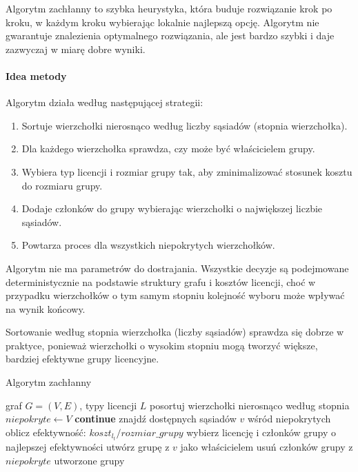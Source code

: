 Algorytm zachłanny to szybka heurystyka, która buduje rozwiązanie krok po kroku, w każdym kroku wybierając lokalnie najlepszą opcję. Algorytm nie gwarantuje znalezienia optymalnego rozwiązania, ale jest bardzo szybki i daje zazwyczaj w miarę dobre wyniki.

\paragraph{Idea metody}
Algorytm działa według następującej strategii:
\begin{enumerate}
  \item Sortuje wierzchołki nierosnąco według liczby sąsiadów (stopnia wierzchołka).
  \item Dla każdego wierzchołka sprawdza, czy może być właścicielem grupy.
  \item Wybiera typ licencji i rozmiar grupy tak, aby zminimalizować stosunek kosztu do rozmiaru grupy.
  \item Dodaje członków do grupy wybierając wierzchołki o największej liczbie sąsiadów.
  \item Powtarza proces dla wszystkich niepokrytych wierzchołków.
\end{enumerate}

Algorytm nie ma parametrów do dostrajania. Wszystkie decyzje są podejmowane deterministycznie na podstawie struktury grafu i kosztów licencji, choć w przypadku wierzchołków o tym samym stopniu kolejność wyboru może wpływać na wynik końcowy.

Sortowanie według stopnia wierzchołka (liczby sąsiadów) sprawdza się dobrze w praktyce, ponieważ wierzchołki o wysokim stopniu mogą tworzyć większe, bardziej efektywne grupy licencyjne.

\begin{algorithm}[H]
  \caption{Algorytm zachłanny}
  \label{alg:greedy}
  \begin{algorithmic}[1]
    \Require graf $G=(V,E)$, typy licencji $ L$
    \State posortuj wierzchołki nierosnąco według stopnia
    \State $niepokryte \gets V$
     \textbf{continue} \EndIf
    \State znajdź dostępnych sąsiadów $v$ wśród niepokrytych
    \State oblicz efektywność: $koszt_{l_t} / rozmiar\_grupy$
    \EndFor
    \State wybierz licencję i członków grupy o najlepszej efektywności
    \State utwórz grupę z $v$ jako właścicielem
    \State usuń członków grupy z $niepokryte$
    \EndFor
    \State \Return utworzone grupy
  \end{algorithmic}
\end{algorithm}


